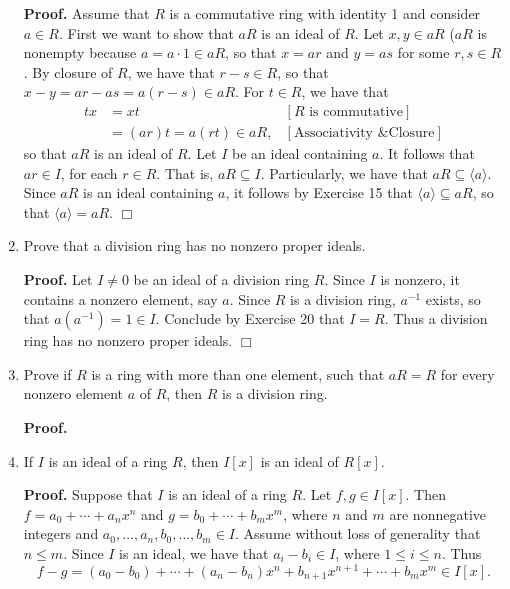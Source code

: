 \documentclass[9pt]{article}
\newcommand{\qed}{\hfill \ensuremath{\Box}}
\newcommand{\cyc}[1]{\langle #1 \rangle}
\begin{document}
\begin{enumerate}
      \textbf{Proof.} Assume that $R$ is a commutative ring with identity 1 and
      consider $a \in R$. First we want to show that $aR$ is an ideal of $R$.
      Let $x, y \in aR$ ($aR$ is nonempty because $a = a \cdot 1 \in aR$, so
      that $x = ar$ and $y = as$ for some $r, s \in R$. By closure of $R$, we
      have that $r - s \in R$, so that $x - y = ar - as = a(r - s) \in aR$. For
      $t \in R$, we have that
      \begin{align*}
         tx &= xt &[R \text{ is commutative}] \\
            &= (ar)t = a(rt) \in aR, &[\text{Associativity \& Closure}]
      \end{align*}
      so that $aR$ is an ideal of $R$. Let $I$ be an ideal containing $a$. It
      follows that $ar \in I$, for each $r \in R$. That is, $aR \subseteq I$.
      Particularly, we have that $aR \subseteq \cyc{a}$. Since $aR$ is an ideal
      containing $a$, it follows by Exercise 15 that $\cyc{a} \subseteq aR$, so
      that $\cyc{a} =aR$. \qed
   \item Prove that a division ring has no nonzero proper ideals.
         
      \textbf{Proof.} Let $I \neq 0$ be an ideal of a division ring $R$. Since
      $I$ is nonzero, it contains a nonzero element, say $a$. Since $R$ is a
      division ring, $a^{-1}$ exists, so that $a(a^{-1}) = 1 \in I$. Conclude by
      Exercise 20 that $I = R$. Thus a division ring has no nonzero proper
      ideals. \qed
   \item Prove if $R$ is a ring with more than one element, such that $aR = R$
         for every nonzero element $a$ of $R$, then $R$ is a division ring.
         
      \textbf{Proof.}
   \item If $I$ is an ideal of a ring $R$, then $I[x]$ is an ideal of $R[x]$.
         
      \textbf{Proof.} Suppose that $I$ is an ideal of a ring $R$. Let
      $f, g \in I[x]$. Then $f = a_0 + \cdots + a_nx^n$ and
      $g = b_0 + \cdots + b_mx^m$, where $n$ and $m$ are nonnegative integers
      and $a_0, \ldots, a_n, b_0, \ldots, b_m \in I$. Assume without loss of
      generality that $n \le m$. Since $I$ is an ideal, we have that
      $a_i - b_i \in I$, where $1 \le i \le n$. Thus
      $$f - g = (a_0 - b_0) + \cdots + (a_n - b_n)x^n + b_{n + 1}x^{n + 1} +
        \cdots + b_mx^m \in I[x].$$
\end{enumerate}
\end{document}
